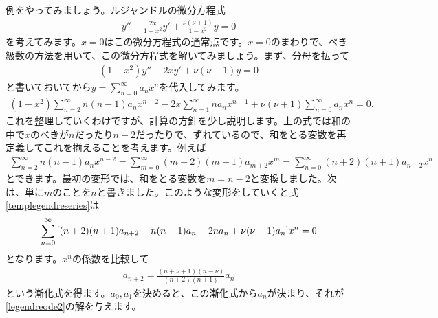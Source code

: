 \documentclass[report,paper=a4, fontsize=12pt, line_length=16cm, number_of_lines=33,dvipdfmx]{jlreq}
\numberwithin{equation}{section}
\begin{document}
例をやってみましょう。ルジャンドルの微分方程式
\begin{align}
  y''-\frac{2x}{1-x^2}y'+\frac{\nu(\nu+1)}{1-x^2}y=0\label{legendreode2}
\end{align}
を考えてみます。$x=0$はこの微分方程式の通常点です。$x=0$のまわりで、べき級数の方法を用いて、この微分方程式を解いてみましょう。まず、分母を払って
\begin{align}
  (1-x^2)y''-2xy'+\nu(\nu+1)y=0
\end{align}
と書いておいてから$y=\sum_{n=0}^{\infty}a_nx^n$を代入してみます。
\begin{align}
  (1-x^2)\sum_{n=2}^{\infty} n(n-1)a_n x^{n-2}-2x\sum_{n=1}^{\infty} n a_n x^{n-1}
  +\nu(\nu+1)\sum_{n=0}^{\infty}a_n x^n=0.\label{templegendreseries}
\end{align}
これを整理していくわけですが、計算の方針を少し説明します。上の式では和の中で$x$のべきが$n$だったり$n-2$だったりで、ずれているので、和をとる変数を再定義してこれを揃えることを考えます。例えば
\begin{align}
  \sum_{n=2}^{\infty}n(n-1)a_nx^{n-2}
  =
  \sum_{m=0}^{\infty}(m+2)(m+1)a_{m+2}x^{m}
  =
  \sum_{n=0}^{\infty}(n+2)(n+1)a_{n+2}x^{n}
\end{align}
とできます。最初の変形では、和をとる変数を$m=n-2$と変換しました。次は、単に$m$のことを$n$と書きました。このような変形をしていくと式\eqref{templegendreseries}は
\begin{align}
  \sum_{n=0}^{\infty}\qty[
    (n+2)(n+1)a_{n+2}-n(n-1)a_n-2na_n+\nu(\nu+1)a_n
  ]x^n=0
\end{align}
となります。$x^n$の係数を比較して
\begin{align}
  a_{n+2}=\frac{(n+\nu+1)(n-\nu)}{(n+2)(n+1)}a_n\label{legendrerecursion}
\end{align}
という漸化式を得ます。$a_0,a_1$を決めると、この漸化式から$a_n$が決まり、それが\eqref{legendreode2}の解を与えます。
\end{document}
